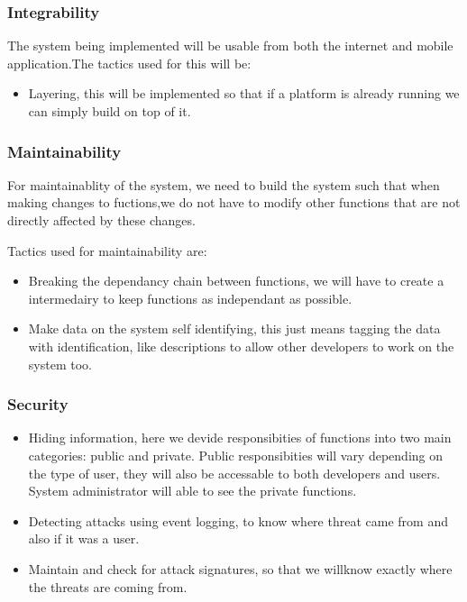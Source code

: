 \documentclass[a4paper,12pt]{report}
\begin{document}
\subsubsection{Integrability}

The system being implemented will be usable from both the internet and mobile application.The tactics used for this will be:
\begin{itemize}
\item Layering, this will be implemented so that if a platform is already running we can simply build on top of it.
\end{itemize}

\subsubsection{Maintainability}

For maintainablity of the system, we need to build the system such that when making changes to fuctions,we do not have to modify other functions that are not directly affected by these changes.

Tactics used for maintainability are:

\begin{itemize}
\item Breaking the dependancy chain between functions, we will have to create a intermedairy to keep functions as independant as possible.

\item Make data on the system self identifying, this just means tagging the data with identification, like descriptions to allow other developers to work on the system too.
\end{itemize}
\subsubsection{Security}

\begin{itemize}
\item Hiding information, here we devide responsibities of functions into two main categories: public and private. Public responsibities will vary depending on the type of user, they will also be accessable to both developers and users. System administrator will able to see the private functions.

\item Detecting attacks using event logging, to know where threat came from and also if it was a user.

\item Maintain and check for attack signatures, so that we willknow exactly where the threats are coming from. 
\end{itemize}
\end{document}
